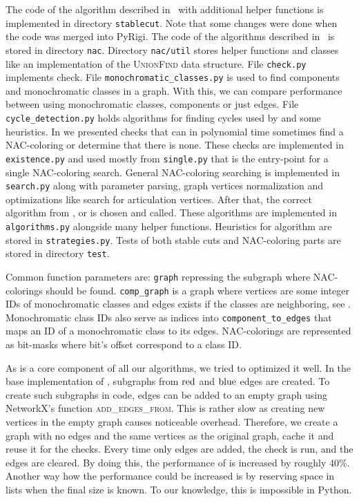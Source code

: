 The code of the algorithm described in~
with additional helper functions is implemented in directory \texttt{stablecut}.
Note that some changes were done when the code was merged into PyRigi.
%
The code of the algorithms described in~
is stored in directory \texttt{nac}.
%
Directory \texttt{nac/util} stores helper functions and classes
like an implementation of the \textsc{UnionFind} data structure.
%
File \texttt{check.py} implements \IsNACColoring{} check.
%
File \texttt{monochromatic\_classes.py} is used to find \trcon{} components
and monochromatic classes in a graph. With this, we can compare performance
between using monochromatic classes, \trcon{} components or just edges.
%
File \texttt{cycle\_detection.py} holds algorithms for finding cycles
used by 
and some heuristics.
%
In 
we presented checks that can in polynomial time
sometimes find a NAC-coloring or determine that there is none.
These checks are implemented in \texttt{existence.py} and
used mostly from \texttt{single.py} that is the entry-point
for a single NAC-coloring search.
%
General NAC-coloring searching is implemented in \texttt{search.py}
along with parameter parsing, graph vertices normalization and
optimizations like search for articulation vertices.
After that, the correct algorithm from \Naive{}, \NaiveCycles{} or \Subgraphs{}
is chosen and called.
%
These algorithms are implemented in \texttt{algorithms.py} alongside many helper functions.
Heuristics for \Subgraphs{} algorithm are stored in \texttt{strategies.py}.
%
Tests of both stable cuts and NAC-coloring parts are stored in directory \texttt{test}.

Common function parameters are:
\texttt{graph} repressing the subgraph where NAC-colorings should be found.
%
\texttt{comp\_graph} is a graph where vertices are some integer IDs of monochromatic classes
and edges exists if the classes are neighboring,
see .
%
Monochromatic class IDs also serve as indices into \texttt{component\_to\_edges}
that maps an ID of a monochromatic class to its edges.
%
NAC-colorings are represented as bit-masks where bit's offset correspond to a class ID\@.

As \IsNACColoring{} is a core component of all our algorithms,
we tried to optimized it well.
%
In the base implementation of \IsNACColoring{},
subgraphs from \( \text{red} \) and \( \text{blue} \) edges are created.
To create such subgraphs in code, edges can be added to an empty graph
using NetworkX's function \textsc{add\_edges\_from}.
%
This is rather slow as creating new vertices in the empty graph causes noticeable overhead.
Therefore, we create a graph with no edges and the same vertices as the original graph,
cache it and reuse it for the checks.
Every time only edges are added, the check is run, and the edges are cleared.
By doing this, the performance of \IsNACColoring{} is increased by roughly 40\%.
%
Another way how the performance could be increased is by reserving space in lists
when the final size is known.
To our knowledge, this is impossible in Python.


